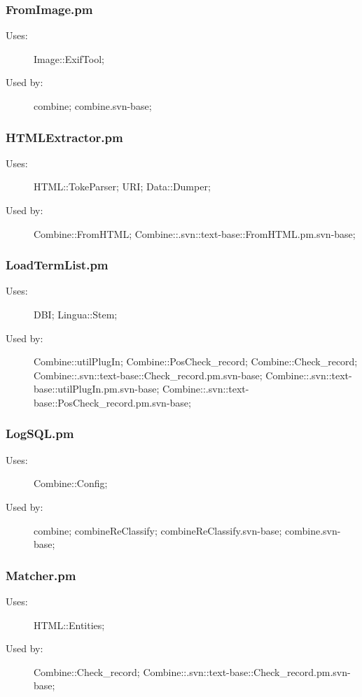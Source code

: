 \subsubsection{FromImage.pm}
\begin{description}
\item[Uses:] Image::ExifTool; 

\item[Used by:] combine; combine.svn-base; 

\end{description}
\subsubsection{HTMLExtractor.pm}
\begin{description}
\item[Uses:] HTML::TokeParser; URI; Data::Dumper; 

\item[Used by:] Combine::FromHTML; Combine::.svn::text-base::FromHTML.pm.svn-base; 

\end{description}
\subsubsection{LoadTermList.pm}
\begin{description}
\item[Uses:] DBI; Lingua::Stem; 

\item[Used by:] Combine::utilPlugIn; Combine::PosCheck\_record; Combine::Check\_record; Combine::.svn::text-base::Check\_record.pm.svn-base; Combine::.svn::text-base::utilPlugIn.pm.svn-base; Combine::.svn::text-base::PosCheck\_record.pm.svn-base; 

\end{description}
\subsubsection{LogSQL.pm}
\begin{description}
\item[Uses:] Combine::Config; 

\item[Used by:] combine; combineReClassify; combineReClassify.svn-base; combine.svn-base; 

\end{description}
\subsubsection{Matcher.pm}
\begin{description}
\item[Uses:] HTML::Entities; 

\item[Used by:] Combine::Check\_record; Combine::.svn::text-base::Check\_record.pm.svn-base; 

\end{description}
